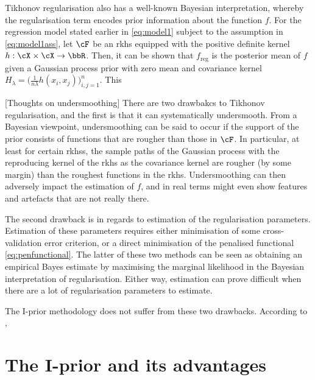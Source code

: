 Tikhonov regularisation also has a well-known Bayesian interpretation, whereby the regularisation term encodes prior information about the function $f$. For the regression model stated earlier in \eqref{eq:model1} subject to the assumption in \eqref{eq:model1ass}, let $\cF$ be an \gls{rkhs} equipped with the positive definite kernel $h:\cX \times \cX \to \bbR$. Then, it can be shown that $f_{\text{reg}}$ is the posterior mean of $f$ given a Gaussian process prior with zero mean and covariance kernel $H_\lambda = \big(\frac{1}{n\lambda} h(x_i, x_j)\big)_{i,j=1}^n$. This 


[Thoughts on undersmoothing]
There are two drawbakcs to Tikhonov regularisation, and the first is that it can systematically undersmooth.
From a Bayesian viewpoint, undersmoothing can be said to occur if the support of the prior consists of functions that are rougher than those in $\cF$. 
In particular, at least for certain \gls{rkhs}s, the sample paths of the Gaussian process with the reproducing kernel of the \gls{rkhs} as the covariance kernel are rougher (by some margin) than the roughest functions in the \gls{rkhs}. 
Undersmoothing can then adversely impact the estimation of $f$, and in real terms might even show features and artefacts that are not really there.


The second drawback is in regards to estimation of the regularisation parameters.
Estimation of these parameters requires either minimisation of some cross-validation error criterion, or a direct minimisation of the penalised functional \eqref{eq:penfunctional}. 
The latter of these two methods can be seen as obtaining an empirical Bayes estimate by maximising the marginal likelihood in the Bayesian interpretation of regularisation.
Either way, estimation can prove difficult when there are a lot of regularisation parameters to estimate.


The I-prior methodology does not suffer from these two drawbacks.
According to \citet{bergsma2017}, 


\section{The I-prior and its advantages}

